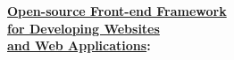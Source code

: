 \hspace{1em}\textbf{\faGlobe\hspace{0.5em}\underline{Open-source Front-end Framework} \\\hspace{2.1em} \underline{for Developing Websites} \\\hspace{2.1em} \underline{and Web Applications}:}\\

\vspace{1mm} %

\hspace{3em}

\divider


